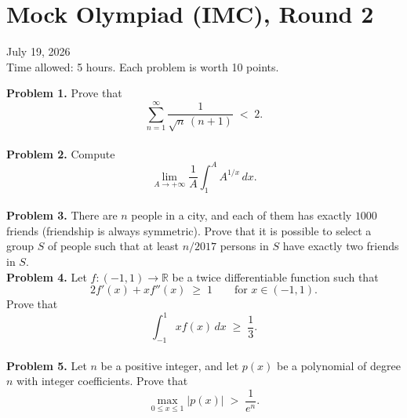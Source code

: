 \documentclass{article}
\newcommand{\R}{\mathbb{R}}
\begin{document}
\pagestyle{plain}

\section*{Mock Olympiad (IMC), Round 2}

\begin{center}
July 19, 2026 \\
Time allowed: 5 hours. Each problem is worth 10 points.
\end{center}

\textbf{Problem 1.} %
Prove that
\[
\sum_{n=1}^{\infty} \frac{1}{\sqrt{n}\,(n+1)} \;<\; 2.
\]
\\

\textbf{Problem 2.} %
Compute
\[
\lim_{A \to +\infty} \frac{1}{A} \int_{1}^{A} A^{1/x}\, dx.
\]
\\

\textbf{Problem 3.} %
There are \( n \) people in a city, and each of them has exactly \( 1000 \) friends (friendship is always symmetric). Prove that it is possible to select a group \( S \) of people such that at least \( n/2017 \) persons in \( S \) have exactly two friends in \( S \).
\\

\textbf{Problem 4.} %
Let \( f : (-1, 1) \to \R \) be a twice differentiable function such that
\[
2 f'(x) + x f''(x) \;\geq\; 1 \qquad \text{for } x \in (-1, 1).
\]
Prove that
\[
\int_{-1}^{1} x f(x)\, dx \;\geq\; \frac{1}{3}.
\]
\\

\textbf{Problem 5.} %
Let \( n \) be a positive integer, and let \( p(x) \) be a polynomial of degree \( n \) with integer coefficients. Prove that
\[
\max_{0 \leq x \leq 1} \left| p(x) \right| \;>\; \frac{1}{e^n}.
\]
\end{document}
